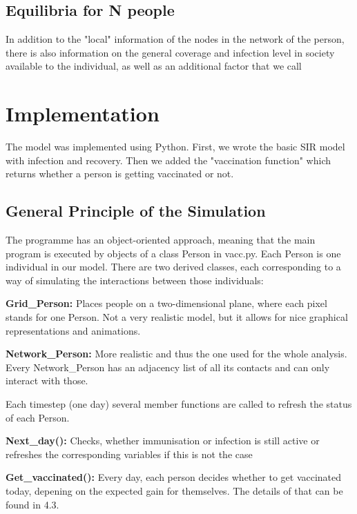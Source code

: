 \documentclass[11pt]{article}
\begin{document}
\subsection{Equilibria for N people}
In addition to the "local" information of the nodes in the network of the person, there is also information on the general coverage and infection level in society available to the individual, as well as an additional factor that we call 


\section{Implementation}
The model was implemented using Python. First, we wrote the basic SIR model with infection and recovery. Then we added the "vaccination function" which returns whether a person is getting vaccinated or not. 

\vspace{14px}

\subsection{General Principle of the Simulation}
The programme has an object-oriented approach, meaning that the main program is executed by objects of a class Person in vacc.py. Each Person is one individual in our model. There are two derived classes, each corresponding to a way of simulating the interactions between those individuals:
\vspace{14px}

\textbf{Grid\_Person:} Places people on a two-dimensional plane, where each pixel stands for one Person. Not a very realistic model, but it allows for nice graphical representations and animations.
\vspace{14px}

\textbf{Network\_Person:} More realistic and thus the one used for the whole analysis. Every Network\_Person has an adjacency list of all its contacts and can only interact with those.
\vspace{14px}

Each timestep (one day) several member functions are called to refresh the status of each Person.

\textbf{Next\_day():} Checks, whether immunisation or infection is still active or refreshes the corresponding variables if this is not the case

\textbf{Get\_vaccinated():} Every day, each person decides whether to get vaccinated today, depening on the expected gain for themselves. The details of that can be found in 4.3. 
\end{document}
